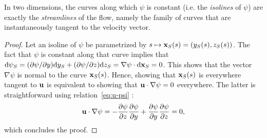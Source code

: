 \begin{propertyapp} \label{prop:streamfunction-tangent}
	In two dimensions, the curves along which $\psi$ is constant (i.e. the \textit{isolines} of  $\psi$) are exactly the \textit{streamlines} of the flow, namely the family of curves that are instantaneously tangent to the velocity vector.
\end{propertyapp}
\begin{proof}
	Let an isoline of $\psi$ be parametrized by $s \mapsto \mathbf x_S(s) = (y_S(s),z_S(s))$. The fact that $\psi$ is constant along that curve implies that $\mathrm d\psi_S = (\partial \psi/\partial y)\mathrm dy_S + (\partial \psi/\partial z) \mathrm dz_S = \nabla \psi \cdot \mathrm d \mathbf x_S = 0$. This shows that the vector $\nabla \psi$ is normal to the curve $\mathbf x_S(s)$. Hence, showing that $\mathbf x_S(s)$ is everywhere tangent to $\mathbf u$ is equivalent to showing that $\mathbf u \cdot \nabla \psi = 0$ everywhere. The latter is straightforward using relation~\eqref{eq:u-psi} :
\begin{equation}
	\mathbf u \cdot \nabla \psi = -\frac{\partial \psi}{\partial z}\frac{\partial \psi}{\partial y} + \frac{\partial \psi}{\partial y}\frac{\partial \psi}{\partial z} = 0,
\end{equation}
which concludes the proof.
\end{proof}

